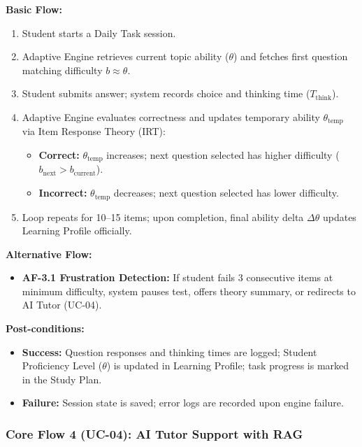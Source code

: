 \documentclass[12pt,a4paper]{article}
\begin{document}
\noindent\textbf{Basic Flow:}
\begin{enumerate}[leftmargin=1.5em, itemsep=0.2em]
    \item Student starts a Daily Task session.
    \item Adaptive Engine retrieves current topic ability ($\theta$) and fetches first question matching difficulty $b \approx \theta$.
    \item Student submits answer; system records choice and thinking time ($T_{\text{think}}$).
    \item Adaptive Engine evaluates correctness and updates temporary ability $\theta_{\text{temp}}$ via Item Response Theory (IRT):
    \begin{itemize}[leftmargin=1.5em, itemsep=0.1em]
        \item \textbf{Correct:} $\theta_{\text{temp}}$ increases; next question selected has higher difficulty ($b_{\text{next}} > b_{\text{current}}$).
        \item \textbf{Incorrect:} $\theta_{\text{temp}}$ decreases; next question selected has lower difficulty.
    \end{itemize}
    \item Loop repeats for 10--15 items; upon completion, final ability delta $\Delta\theta$ updates Learning Profile officially.
\end{enumerate}

\noindent\textbf{Alternative Flow:}
\begin{itemize}[leftmargin=1.5em, itemsep=0.2em]
    \item \textbf{AF-3.1 Frustration Detection:} If student fails 3 consecutive items at minimum difficulty, system pauses test, offers theory summary, or redirects to AI Tutor (UC-04).
\end{itemize}

\noindent\textbf{Post-conditions:}
\begin{itemize}[leftmargin=1.5em, itemsep=0.2em]
    \item \textbf{Success:} Question responses and thinking times are logged; Student Proficiency Level ($\theta$) is updated in Learning Profile; task progress is marked in the Study Plan.
    \item \textbf{Failure:} Session state is saved; error logs are recorded upon engine failure.
\end{itemize}

\subsubsection{Core Flow 4 (UC-04): AI Tutor Support with RAG}
\end{document}
